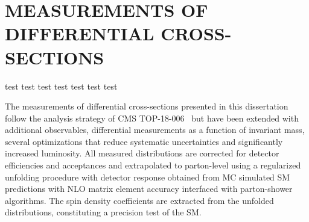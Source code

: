 
\chapter{MEASUREMENTS OF DIFFERENTIAL CROSS-SECTIONS}
\label{Measurements_of_Differential_Cross-sections}

\begin{cabstract}
test test test test test test test
\end{cabstract}

The measurements of differential cross-sections presented in this dissertation follow the analysis strategy of CMS TOP-18-006~\cite{Sirunyan:2681777} but have been extended with additional observables, differential measurements as a function of \ttbar invariant mass, several optimizations that reduce systematic uncertainties and significantly increased luminosity.
All measured distributions are corrected for detector efficiencies and acceptances and extrapolated to parton-level using a regularized unfolding procedure with detector response obtained from MC simulated SM predictions with NLO matrix element accuracy interfaced with parton-shower algorithms.
The spin density coefficients are extracted from the unfolded distributions, constituting a precision test of the SM.

